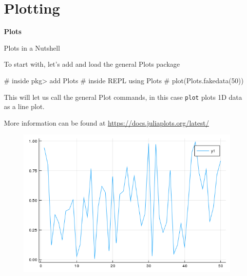 \documentclass{beamer}
\newenvironment{Boxx}{\begin{tcolorbox}[standard jigsaw, opacityframe=0.8, opacityback=0.0,left=2pt,right=2pt,top=0pt,bottom=0pt]}{\end{tcolorbox}}
\begin{document}
\section{Plotting}

\begin{frame}[plain]

\centering \Huge \textbf{Plots}

\end{frame}


\begin{frame}[fragile]{Plots in a Nutshell}
	\begin{minipage}{0.6\linewidth}
			To start with, let's add and load the general Plots package
		\begin{Boxx}
		\begin{jllisting}
					# inside pkg>
					add Plots
					# inside REPL
					using Plots
					# plot(Plots.fakedata(50))
			\end{jllisting}
		\end{Boxx}
		This will let us call the general Plot commands, in this case \verb|plot| plots 1D data as a line plot.
		
		More information can be found at \url{https://docs.juliaplots.org/latest/}
	\end{minipage}%
	\begin{minipage}{0.4\linewidth}
		\begin{figure}
			\centering
			\includegraphics[width=\textwidth]{randPlot}
		\end{figure}
	\end{minipage}
\end{frame}
\end{document}
